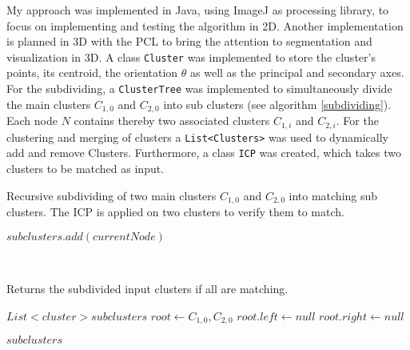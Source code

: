 My approach was implemented in Java, using ImageJ as processing library, to focus on implementing and testing the algorithm in 2D. Another implementation is planned in 3D with the PCL to bring the attention to segmentation and visualization in 3D. A class \texttt{Cluster} was implemented to store the cluster's points, its centroid, the orientation $\theta$ as well as the principal and secondary axes. For the subdividing, a \texttt{ClusterTree} was implemented to simultaneously divide the main clusters $C_{1,0}$ and $C_{2,0}$ into sub clusters (see algorithm \ref{subdividing}). Each node $N$ contains thereby two associated clusters $C_{1,i}$ and $C_{2,i}$. For the clustering and merging of clusters a \texttt{List<Clusters>} was used to dynamically add and remove Clusters. Furthermore, a class \texttt{ICP} was created, which takes two clusters to be matched as input.
\begin{algorithm}[tbp]
	\caption{Recursive subdividing of two main clusters $C_{1,0}$ and $C_{2,0}$ into matching sub clusters. The ICP is applied on two clusters to verify them to match.}
	\label{alg:clustering}
	
	\begin{algorithmic}[1]     %
		\label{subdividing}
		
		\State $subclusters.add(currentNode)$
		
		\Else
		\State {}
		\State {}
		\State {}
		
		\EndIf
		\\
		
		\EndProcedure	
		
		
		\Statex Returns the subdivided input clusters if all are matching.
		
		\State $List<cluster> subclusters$
		\State $root \gets C_{1,0}, C_{2,0}$
		\State $root.left \gets null$
		\State $root.right \gets null$
		
		
		\State\Return $\mathit{subclusters}$
		
		\EndProcedure
	\end{algorithmic}
\end{algorithm}


